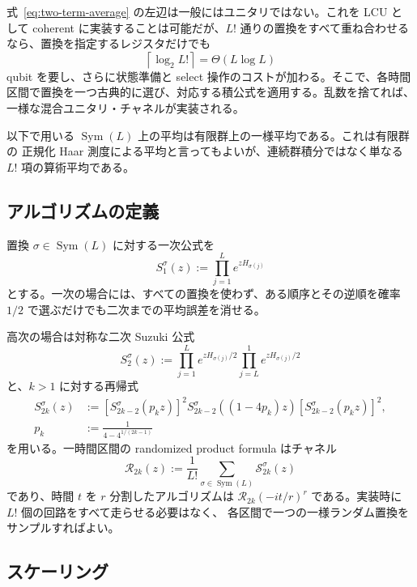 \documentclass[uplatex,dvipdfmx,11pt,a4paper]{jsarticle}
\newcommand{\cR}{\mathcal{R}}
\newcommand{\cS}{\mathcal{S}}
\newcommand{\Sym}{\operatorname{Sym}}
\begin{document}
式~\eqref{eq:two-term-average} の左辺は一般にはユニタリではない。これを LCU と
して coherent に実装することは可能だが、$L!$ 通りの置換をすべて重ね合わせる
なら、置換を指定するレジスタだけでも
\begin{equation}
  \left\lceil\log_2L!\right\rceil
  =\Theta(L\log L)
\end{equation}
qubit を要し、さらに状態準備と select 操作のコストが加わる。そこで、各時間
区間で置換を一つ古典的に選び、対応する積公式を適用する。乱数を捨てれば、
一様な混合ユニタリ・チャネルが実装される。

以下で用いる $\Sym(L)$ 上の平均は有限群上の一様平均である。これは有限群の
正規化 Haar 測度による平均と言ってもよいが、連続群積分ではなく単なる
$L!$ 項の算術平均である。

\subsection{アルゴリズムの定義}

置換 $\sigma\in\Sym(L)$ に対する一次公式を
\begin{equation}
  S_1^\sigma(z):=\prod_{j=1}^{L}e^{zH_{\sigma(j)}}
\end{equation}
とする。一次の場合には、すべての置換を使わず、ある順序とその逆順を確率
$1/2$ で選ぶだけでも二次までの平均誤差を消せる。

高次の場合は対称な二次 Suzuki 公式
\begin{equation}
  S_2^\sigma(z)
  :=\prod_{j=1}^{L}e^{zH_{\sigma(j)}/2}
    \prod_{j=L}^{1}e^{zH_{\sigma(j)}/2}
\end{equation}
と、$k>1$ に対する再帰式
\begin{align}
  S_{2k}^\sigma(z)
  &:=[S_{2k-2}^\sigma(p_kz)]^2
    S_{2k-2}^\sigma((1-4p_k)z)
    [S_{2k-2}^\sigma(p_kz)]^2,\\
  p_k&:=\frac{1}{4-4^{1/(2k-1)}}
\end{align}
を用いる。一時間区間の randomized product formula はチャネル
\begin{equation}
  \cR_{2k}(z)
  :=\frac{1}{L!}\sum_{\sigma\in\Sym(L)}\cS_{2k}^\sigma(z)
  \label{eq:randomized-channel}
\end{equation}
であり、時間 $t$ を $r$ 分割したアルゴリズムは
$\cR_{2k}(-it/r)^r$ である。実装時に $L!$ 個の回路をすべて走らせる必要はなく、
各区間で一つの一様ランダム置換をサンプルすればよい。

\subsection{スケーリング}
\end{document}
